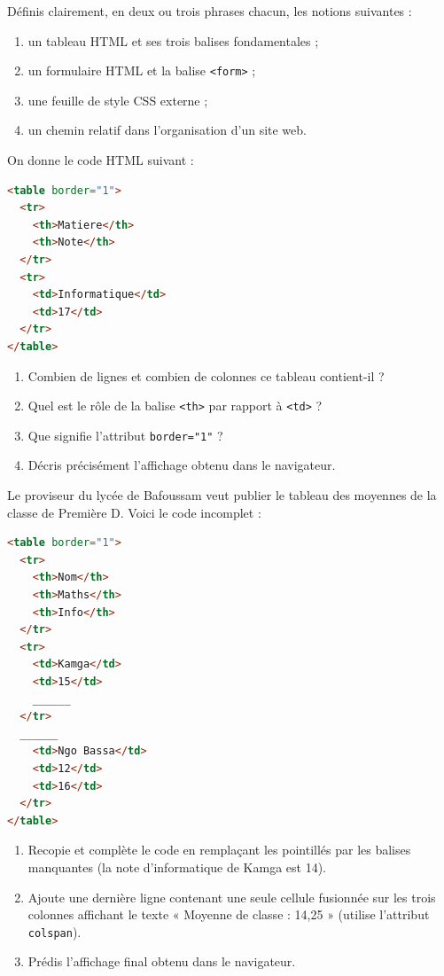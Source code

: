 \documentclass[11pt]{article}
\newcommand{\cle}[1]{{\popxbold\color{popdark}#1}}
\newcounter{popsec}
\newcounter{popsub}
\newcommand{\courssub}[1]{%
  \stepcounter{popsub}%
  \par\vspace{9pt}\noindent{\popxbold\fontsize{11.5}{13}\selectfont\color{popink}{\color{poporange}\thepopsec.\thepopsub}\hspace{6pt}#1}\par\nopagebreak\vspace{4pt}
}
\begin{document}
\begin{exercice}[Définitions]
Définis clairement, en deux ou trois phrases chacun, les notions suivantes :
\begin{enumerate}
  \item un \cle{tableau} HTML et ses trois balises fondamentales ;
  \item un \cle{formulaire} HTML et la balise \texttt{<form>} ;
  \item une \cle{feuille de style} CSS externe ;
  \item un \cle{chemin relatif} dans l'organisation d'un site web.
\end{enumerate}
\end{exercice}

\begin{exercice}
On donne le code HTML suivant :
\begin{lstlisting}[language=HTML]
<table border="1">
  <tr>
    <th>Matiere</th>
    <th>Note</th>
  </tr>
  <tr>
    <td>Informatique</td>
    <td>17</td>
  </tr>
</table>
\end{lstlisting}
\begin{enumerate}
  \item Combien de lignes et combien de colonnes ce tableau contient-il ?
  \item Quel est le rôle de la balise \texttt{<th>} par rapport à \texttt{<td>} ?
  \item Que signifie l'attribut \texttt{border="1"} ?
  \item Décris précisément l'affichage obtenu dans le navigateur.
\end{enumerate}
\end{exercice}

\courssub{Je m'entraîne}

\begin{exercice}
Le proviseur du lycée de Bafoussam veut publier le tableau des moyennes de la classe de Première D. Voici le code incomplet :
\begin{lstlisting}[language=HTML]
<table border="1">
  <tr>
    <th>Nom</th>
    <th>Maths</th>
    <th>Info</th>
  </tr>
  <tr>
    <td>Kamga</td>
    <td>15</td>
    ______
  </tr>
  ______
    <td>Ngo Bassa</td>
    <td>12</td>
    <td>16</td>
  </tr>
</table>
\end{lstlisting}
\begin{enumerate}
  \item Recopie et complète le code en remplaçant les pointillés par les balises manquantes (la note d'informatique de Kamga est 14).
  \item Ajoute une dernière ligne contenant une seule cellule fusionnée sur les trois colonnes affichant le texte « Moyenne de classe : 14,25 » (utilise l'attribut \texttt{colspan}).
  \item Prédis l'affichage final obtenu dans le navigateur.
\end{enumerate}
\end{exercice}
\end{document}
